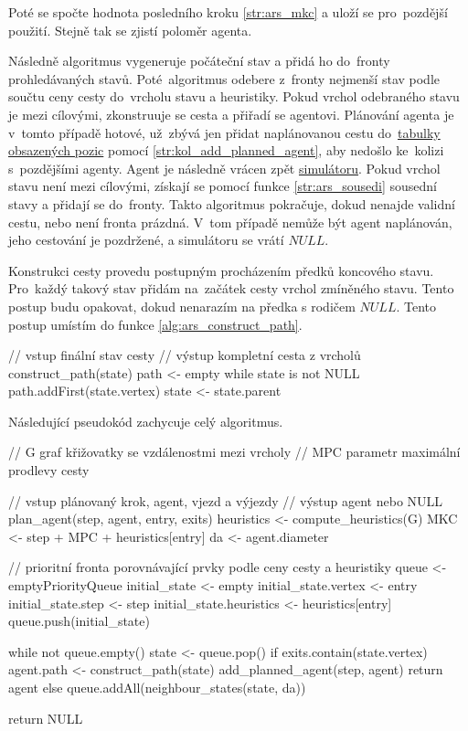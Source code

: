 Poté se spočte hodnota posledního kroku \ref{str:ars_mkc} a uloží se pro~pozdější použití.
Stejně tak se zjistí poloměr agenta.

Následně algoritmus vygeneruje počáteční stav a přidá ho do~fronty prohledávaných stavů.
Poté~algoritmus odebere z~fronty nejmenší stav podle součtu ceny cesty do~vrcholu stavu a heuristiky.
Pokud vrchol odebraného stavu je mezi cílovými, zkonstruuje se cesta a přiřadí se agentovi.
Plánování agenta je v~tomto případě hotové, už~zbývá jen přidat naplánovanou cestu
do~\hyperref[par:obsazene_pozice]{tabulky obsazených pozic} pomocí \ref{str:kol_add_planned_agent},
aby nedošlo ke~kolizi s~pozdějšími agenty.
Agent je následně vrácen zpět \hyperref[sec:simulace]{simulátoru}.
Pokud vrchol stavu není mezi cílovými,
získají se pomocí funkce \ref{str:ars_sousedi} sousední stavy a přidají se do~fronty.
Takto algoritmus pokračuje, dokud nenajde validní cestu, nebo není fronta prázdná.
V~tom případě nemůže být agent naplánován, jeho cestování je pozdržené, a simulátoru se vrátí $NULL$.

Konstrukci cesty provedu postupným procházením předků koncového stavu.
Pro~každý takový stav přidám na~začátek cesty vrchol zmíněného stavu.
Tento postup budu opakovat, dokud nenarazím na předka s rodičem $NULL$.
Tento postup umístím do funkce \ref{alg:ars_construct_path}.

\begin{code}[fontsize=\footnotesize]
// vstup finální stav cesty
// výstup kompletní cesta z vrcholů
construct_path(state)
  path <- empty
  while state is not NULL
    path.addFirst(state.vertex)
    state <- state.parent
\end{code}


Následující pseudokód zachycuje celý  algoritmus.

\begin{code}[fontsize=\footnotesize]
// G graf křižovatky se vzdálenostmi mezi vrcholy
// MPC parametr maximální prodlevy cesty

// vstup plánovaný krok, agent, vjezd a výjezdy
// výstup agent nebo NULL
plan_agent(step, agent, entry, exits)
  heuristics <- compute_heuristics(G)
  MKC <- step + MPC + heuristics[entry]
  da <- agent.diameter

  // prioritní fronta porovnávající prvky podle ceny cesty a heuristiky
  queue <- emptyPriorityQueue
  initial_state <- empty
  initial_state.vertex <- entry
  initial_state.step <- step
  initial_state.heuristics <- heuristics[entry]
  queue.push(initial_state)

  while not queue.empty()
    state <- queue.pop()
    if exits.contain(state.vertex)
      agent.path <- construct_path(state)
      add_planned_agent(step, agent)
      return agent
    else
      queue.addAll(neighbour_states(state, da))

  return NULL
\end{code}


